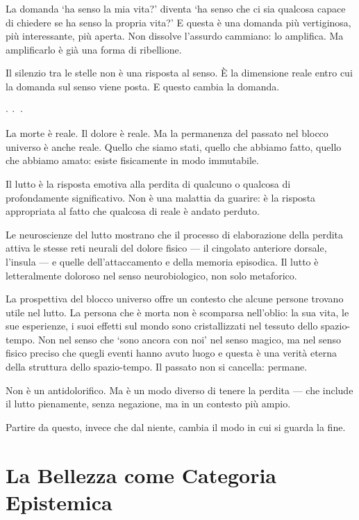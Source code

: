 \documentclass[12pt,a4paper,openany]{book}
\newcommand{\sezione}[1]{\vspace{1.2em}{\large\bfseries #1}\vspace{0.5em}\par}
\newcommand{\puntini}{\begin{center}$\cdot\ \cdot\ \cdot$\end{center}\vspace{0.3em}}
\begin{document}
La domanda `ha senso la mia vita?' diventa `ha senso che ci sia qualcosa capace di chiedere se ha senso la propria vita?' E questa è una domanda più vertiginosa, più interessante, più aperta. Non dissolve l'assurdo cammiano: lo amplifica. Ma amplificarlo è già una forma di ribellione.

Il silenzio tra le stelle non è una risposta al senso. È la dimensione reale entro cui la domanda sul senso viene posta. E questo cambia la domanda.

\puntini

La morte è reale. Il dolore è reale. Ma la permanenza del passato nel blocco universo è anche reale. Quello che siamo stati, quello che abbiamo fatto, quello che abbiamo amato: esiste fisicamente in modo immutabile.

\sezione{Il lutto come elaborazione della perdita relazionale}

Il lutto è la risposta emotiva alla perdita di qualcuno o qualcosa di profondamente significativo. Non è una malattia da guarire: è la risposta appropriata al fatto che qualcosa di reale è andato perduto.

Le neuroscienze del lutto mostrano che il processo di elaborazione della perdita attiva le stesse reti neurali del dolore fisico --- il cingolato anteriore dorsale, l'insula --- e quelle dell'attaccamento e della memoria episodica. Il lutto è letteralmente doloroso nel senso neurobiologico, non solo metaforico.

La prospettiva del blocco universo offre un contesto che alcune persone trovano utile nel lutto. La persona che è morta non è scomparsa nell'oblio: la sua vita, le sue esperienze, i suoi effetti sul mondo sono cristallizzati nel tessuto dello spazio-tempo. Non nel senso che `sono ancora con noi' nel senso magico, ma nel senso fisico preciso che quegli eventi hanno avuto luogo e questa è una verità eterna della struttura dello spazio-tempo. Il passato non si cancella: permane.

Non è un antidolorifico. Ma è un modo diverso di tenere la perdita --- che include il lutto pienamente, senza negazione, ma in un contesto più ampio.

Partire da questo, invece che dal niente, cambia il modo in cui si guarda la fine.

\chapter{La Bellezza come Categoria Epistemica}
\end{document}

